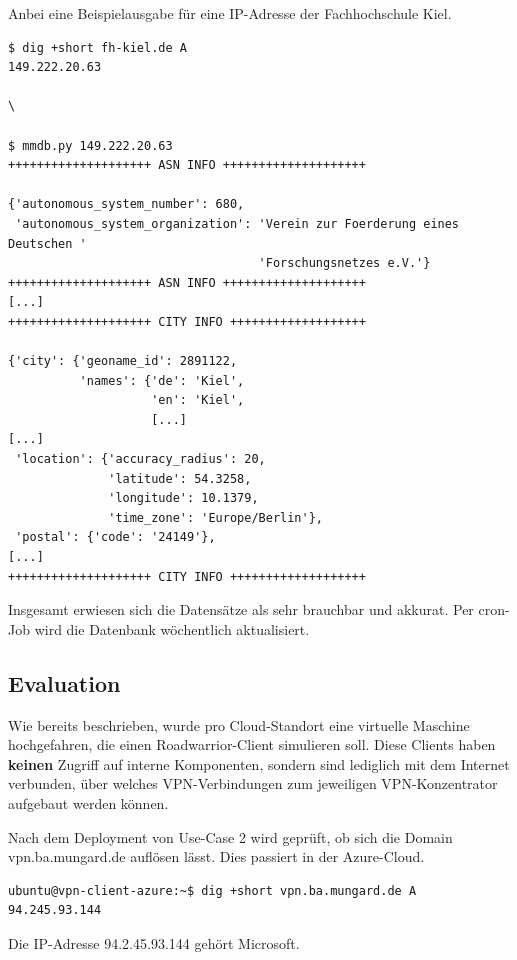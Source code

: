 Anbei eine Beispielausgabe für eine IP-Adresse der Fachhochschule Kiel.

\begin{lstlisting}[label=mmdb-show-ip,caption=.]
$ dig +short fh-kiel.de A
149.222.20.63

\

$ mmdb.py 149.222.20.63
++++++++++++++++++++ ASN INFO ++++++++++++++++++++

{'autonomous_system_number': 680,
 'autonomous_system_organization': 'Verein zur Foerderung eines Deutschen '
                                   'Forschungsnetzes e.V.'}
++++++++++++++++++++ ASN INFO ++++++++++++++++++++
[...]
++++++++++++++++++++ CITY INFO +++++++++++++++++++

{'city': {'geoname_id': 2891122,
          'names': {'de': 'Kiel',
                    'en': 'Kiel',
                    [...]
[...]
 'location': {'accuracy_radius': 20,
              'latitude': 54.3258,
              'longitude': 10.1379,
              'time_zone': 'Europe/Berlin'},
 'postal': {'code': '24149'},
[...]
++++++++++++++++++++ CITY INFO +++++++++++++++++++
\end{lstlisting}

Insgesamt erwiesen sich die Datensätze als sehr brauchbar und akkurat. Per cron-Job wird die Datenbank wöchentlich aktualisiert.

\subsection{Evaluation}


Wie bereits beschrieben, wurde pro Cloud-Standort eine virtuelle Maschine hochgefahren, die einen Roadwarrior-Client simulieren soll. Diese Clients haben \textbf{keinen} Zugriff auf interne Komponenten, sondern sind lediglich mit dem Internet verbunden, über welches VPN-Verbindungen zum jeweiligen VPN-Konzentrator aufgebaut werden können.

Nach dem Deployment von Use-Case 2 wird geprüft, ob sich die Domain vpn.ba.mungard.de auflösen lässt. Dies passiert in der Azure-Cloud.

\begin{lstlisting}[label=dns-resolution-client-vpn,caption=.]
ubuntu@vpn-client-azure:~$ dig +short vpn.ba.mungard.de A
94.245.93.144
\end{lstlisting}

Die IP-Adresse 94.2.45.93.144 gehört Microsoft.


